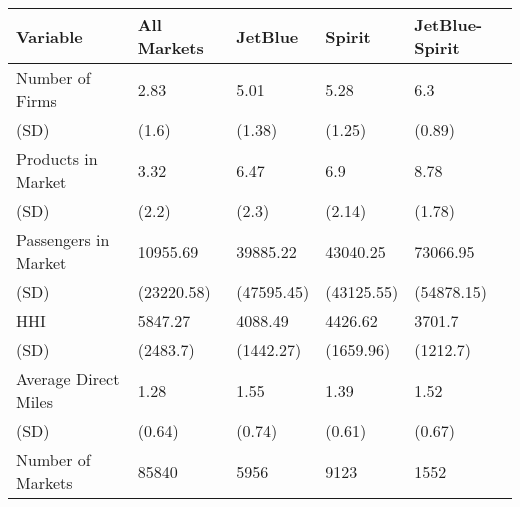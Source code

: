 
\begin{tabular}[t]{lllll}
\toprule
Variable & All Markets & JetBlue & Spirit & JetBlue-Spirit\\
\midrule
Number of Firms & 2.83 & 5.01 & 5.28 & 6.3\\
(SD) & (1.6) & (1.38) & (1.25) & (0.89)\\
Products in Market & 3.32 & 6.47 & 6.9 & 8.78\\
(SD) & (2.2) & (2.3) & (2.14) & (1.78)\\
Passengers in Market & 10955.69 & 39885.22 & 43040.25 & 73066.95\\
(SD) & (23220.58) & (47595.45) & (43125.55) & (54878.15)\\
HHI & 5847.27 & 4088.49 & 4426.62 & 3701.7\\
(SD) & (2483.7) & (1442.27) & (1659.96) & (1212.7)\\
Average Direct Miles & 1.28 & 1.55 & 1.39 & 1.52\\
(SD) & (0.64) & (0.74) & (0.61) & (0.67)\\
\midrule
Number of Markets & 85840 & 5956 & 9123 & 1552\\
\bottomrule
\end{tabular}
